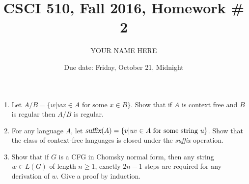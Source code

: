 \documentclass{article}
\title{CSCI 510, Fall 2016, Homework \# 2}
\author{YOUR NAME HERE}
\date{Due date: Friday, October 21, Midnight}
\begin{document}
\maketitle
\begin{enumerate}
\item Let $A/B=\{w| \mbox{$wx\in A$ for some $x\in B$}\}$.  Show that
  if $A$ is context free and $B$ is regular then $A/B$ is regular.

\item For any language $A$, let $\mbox{\sl suffix}(A) =
  \{v|\mbox{$uv\in A$ for some string $u$}\}$.  Show that the class of
  context-free languages is closed under the {\sl suffix} operation.

\item Show that if $G$ is a CFG in Chomsky normal form, then any
  string $w\in L(G)$ of length $n\geq 1$, exactly $2n-1$ steps are
  required for any derivation of $w$.  Give a proof by induction.
\end{enumerate}
\end{document}

